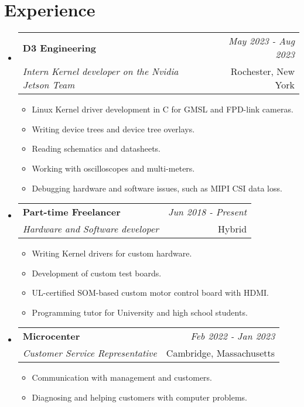 \documentclass[a4paper,11pt]{article}
\makeatletter
\newcommand{\resumeSubheading}[4]{
\vspace{0.5mm}\item
		\begin{tabular*}{0.98\textwidth}[t]{l@{\extracolsep{\fill}}r}
				\textbf{#1} & \textit{\footnotesize{#4}} \\
				\textit{\footnotesize{#3}} &	\footnotesize{#2}\\
		\end{tabular*}
		\vspace{-2.4mm}
}
\newcommand{\resumeSubHeadingListStart}{\begin{itemize}[leftmargin=*,labelsep=0mm]}
\newcommand{\resumeItemListStart}{\begin{justify}\begin{itemize}[leftmargin=3ex, rightmargin=2ex, noitemsep,labelsep=1.2mm,itemsep=0mm]\small}
\newcommand{\resumeSubHeadingListEnd}{\end{itemize}\vspace{2mm}}
\newcommand{\resumeItemListEnd}{\end{itemize}\end{justify}\vspace{-2mm}}
\makeatother
\begin{document}
\section{\textbf{Experience}}
	\resumeSubHeadingListStart
		\resumeSubheading
			{D3 Engineering}{Rochester, New York}
			{Intern Kernel developer on the Nvidia Jetson Team}{May 2023 - Aug 2023}
			\vspace{-2.0mm}
			\resumeItemListStart
		\item {Linux Kernel driver development in C for GMSL and FPD-link cameras.}
		\item {Writing device trees and device tree overlays.}
		\item {Reading schematics and datasheets.}
		\item {Working with oscilloscopes and multi-meters.}
		\item {Debugging hardware and software issues, such as MIPI CSI data loss.}
		\resumeItemListEnd

		\vspace{-3.0mm}

		\resumeSubheading
			{Part-time Freelancer}{Hybrid}
			{Hardware and Software developer}{Jun 2018 - Present}
			\vspace{-2.0mm}
			\resumeItemListStart
			\item {Writing Kernel drivers for custom hardware.}
			\item {Development of custom test boards.}
			\item {UL-certified SOM-based custom motor control board with HDMI.}
			\item {Programming tutor for University and high school students.}
		\resumeItemListEnd

		\vspace{-3.0mm}

		\resumeSubheading
			{Microcenter}{Cambridge, Massachusetts}
			{Customer Service Representative}{Feb 2022 - Jan 2023}
			\vspace{-2.0mm}
			\resumeItemListStart
			\item {Communication with management and customers.}
			\item {Diagnosing and helping customers with computer problems.}
		\resumeItemListEnd

		\vspace{-3.0mm}

	\resumeSubHeadingListEnd
\vspace{-5.5mm}
\end{document}
